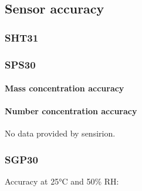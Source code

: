 \subsection*{Sensor accuracy}

\subsubsection*{S\+H\+T31}



\subsubsection*{S\+P\+S30}

\paragraph*{Mass concentration accuracy}



\paragraph*{Number concentration accuracy}

No data provided by sensirion.

\subsubsection*{S\+G\+P30}

Accuracy at 25°C and 50\% RH\+:  